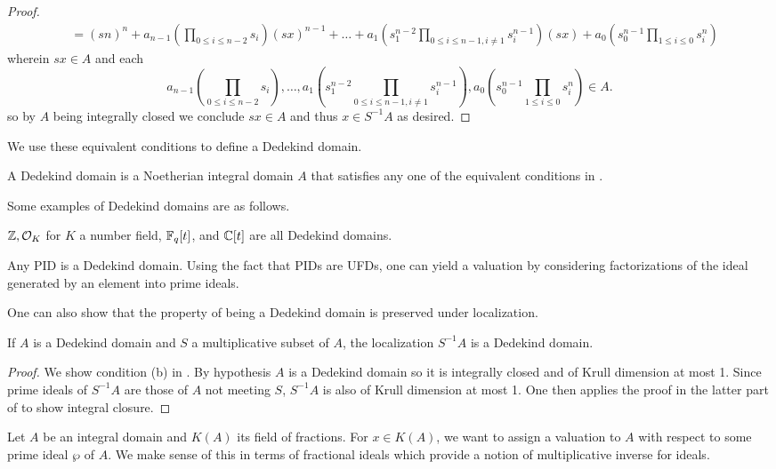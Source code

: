 \begin{proof}
\begin{align*}
    &= (sn)^{n} + a_{n-1}\left(\prod_{0\leq i\leq n-2}s_{i}\right)(sx)^{n-1}+\dots+a_{1}\left(s_{1}^{n-2}\prod_{0\leq i\leq n-1, i\neq 1}s_{i}^{n-1}\right)(sx)+a_{0}\left(s_{0}^{n-1}\prod_{1\leq i\leq 0}s_{i}^{n}\right)
  \end{align*}
  \normalsize
  wherein $sx\in A$ and each 
  \small
  $$a_{n-1}\left(\prod_{0\leq i\leq n-2}s_{i}\right), \dots, a_{1}\left(s_{1}^{n-2}\prod_{0\leq i\leq n-1, i\neq 1}s_{i}^{n-1}\right), a_{0}\left(s_{0}^{n-1}\prod_{1\leq i\leq 0}s_{i}^{n}\right)\in A.$$
  \normalsize
  so by $A$ being integrally closed we conclude $sx\in A$ and thus $x\in S^{-1}A$ as desired. 
\end{proof}
We use these equivalent conditions to define a Dedekind domain. 
\begin{definition}
  A Dedekind domain is a Noetherian integral domain $A$ that satisfies any one of the equivalent conditions in . 
\end{definition}
Some examples of Dedekind domains are as follows. 
\begin{example}
  $\mathbb{Z}, \mathcal{O}_{K}$ for $K$ a number field, $\mathbb{F}_{q}[t]$, and $\mathbb{C}[t]$ are all Dedekind domains. 
\end{example}
\begin{example}
  Any PID is a Dedekind domain. Using the fact that PIDs are UFDs, one can yield a valuation by considering factorizations of the ideal generated by an element into prime ideals. 
\end{example}
One can also show that the property of being a Dedekind domain is preserved under localization. 
\begin{proposition}
  If $A$ is a Dedekind domain and $S$ a multiplicative subset of $A$, the localization $S^{-1}A$ is a Dedekind domain. 
\end{proposition}
\begin{proof}
  We show condition (b) in . By hypothesis $A$ is a Dedekind domain so it is integrally closed and of Krull dimension at most 1. Since prime ideals of $S^{-1}A$ are those of $A$ not meeting $S$, $S^{-1}A$ is also of Krull dimension at most 1. One then applies the proof in the latter part of  to show integral closure. 
\end{proof}
Let $A$ be an integral domain and $K(A)$ its field of fractions. For $x\in K(A)$, we want to assign a valuation to $A$ with respect to some prime ideal $\wp$ of $A$. We make sense of this in terms of fractional ideals which provide a notion of multiplicative inverse for ideals. 
